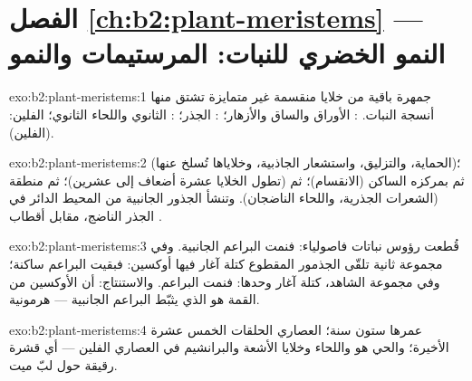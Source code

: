 \section*{الفصل \ref{ch:b2:plant-meristems} --- النمو الخضري للنبات: المرستيمات والنمو}

\begin{solution}{exo:b2:plant-meristems:1}
 جمهرة باقية من خلايا منقسمة غير متمايزة
تشتق منها أنسجة النبات. :
الأوراق والساق والأزهار؛ : الجذر؛ :  الثانوي واللحاء الثانوي؛  الفلين:
  (الفلين).
\end{solution}

\begin{solution}{exo:b2:plant-meristems:2}
 (الحماية، والتزليق، واستشعار الجاذبية، وخلاياها تُسلخ
عنها)؛ ثم  بمركزه الساكن (الانقسام)؛ ثم 
(تطول الخلايا عشرة أضعاف إلى عشرين)؛ ثم منطقة  (الشعرات
الجذرية،  واللحاء الناضجان). وتنشأ الجذور الجانبية من
المحيط الدائر في الجذر الناضج، مقابل أقطاب .
\end{solution}

\begin{solution}{exo:b2:plant-meristems:3}
قُطعت رؤوس نباتات فاصولياء: فنمت البراعم الجانبية. وفي
مجموعة ثانية تلقّى الجذمور المقطوع كتلة آغار فيها أوكسين:
فبقيت البراعم ساكنة؛ وفي مجموعة الشاهد، كتلة آغار وحدها: فنمت
البراعم. والاستنتاج: أن الأوكسين من القمة هو الذي يثبّط
البراعم الجانبية ---  هرمونية.
\end{solution}

\begin{solution}{exo:b2:plant-meristems:4}
عمرها ستون سنة؛  العصاري الحلقات الخمس عشرة الأخيرة؛ والحي
هو  واللحاء وخلايا الأشعة والبرانشيم في
 العصاري  الفلين --- أي قشرة رقيقة حول لبّ ميت.
\end{solution}

